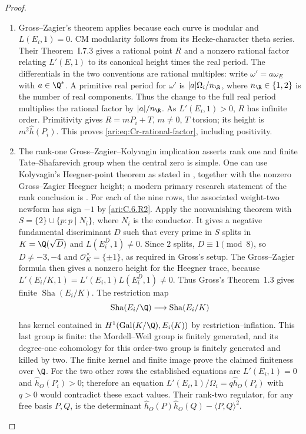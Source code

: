 \begin{proof}

\begin{enumerate}[label=\arabic*.,leftmargin=*]
\item Gross--Zagier's theorem applies because each curve is modular and
$L(E_i,1)=0$. CM modularity follows from its Hecke-character
theta series. Their Theorem~I.7.3 \citep[Chapter~I, Theorem~7.3, preprint p.~12]{CrGrossZagier1986} gives a rational point $R$ and
a nonzero rational factor relating $L'(E,1)$ to its canonical
height times the real period. The differentials in the two conventions are rational multiples:
write $\omega'=a\omega_E$ with $a\in\Q^*$.  A primitive real
period for $\omega'$ is $|a|\Omega_i/n_{\R}$, where
$n_{\R}\in\{1,2\}$ is the number of real components.
Thus the change to the full real period multiplies the rational
factor by $|a|/n_{\R}$.
As $L'(E_i,1)>0$, $R$ has infinite order. Primitivity gives
$R=mP_i+T$, $m\ne0$, $T$ torsion; its height is
$m^2\widehat h(P_i)$. This proves
\eqref{ari:eq:Cr-rational-factor}, including positivity.

\item The rank-one Gross--Zagier--Kolyvagin implication asserts rank one
and finite Tate--Shafarevich group when the central zero is simple.
One can use Kolyvagin's Heegner-point theorem as stated in
\citet[Theorem~1.3, pp.~235--236]{CrGross1991}, together with the nonzero
Gross--Zagier Heegner height; a modern primary research statement
of the rank conclusion is \citet[Theorem~1.1, p.~2 of arXiv v1]{CrJetchev2008}.
For each of the nine rows, the associated weight-two newform has
sign $-1$ by \cref{ari:C.6.R2}. Apply the nonvanishing theorem
\citep[Introduction, Theorem~(ii), pp.~543--544]{BumpFriedbergHoffstein1990}
with $S=\{2\}\cup\{p:p\mid N_i\}$, where $N_i$ is the conductor.
It gives a negative fundamental discriminant $D$ such that every
prime in $S$ splits in $K=\Q(\sqrt D)$ and $L(E_i^D,1)\ne0$.
Since $2$ splits, $D\equiv1\pmod8$, so $D\ne-3,-4$ and
$\mathcal O_K^\times=\{\pm1\}$, as required in Gross's setup.
The Gross--Zagier formula
\citep[Chapter~V, Theorem~2.1, preprint p.~127; proof of I.7.3, p.~129]{CrGrossZagier1986}
then gives a nonzero height for the Heegner trace, because
$L'(E_i/K,1)=L'(E_i,1)L(E_i^D,1)\ne0$.
Thus Gross's Theorem~1.3 gives finite $\operatorname{Sha}(E_i/K)$.
The restriction map
\[
\operatorname{Sha}(E_i/\Q)\longrightarrow
\operatorname{Sha}(E_i/K)
\]
has kernel contained in
$H^1(\operatorname{Gal}(K/\Q),E_i(K))$ by restriction--inflation.
This last group is finite: the Mordell--Weil group is finitely
generated, and its degree-one cohomology for this order-two group
is finitely generated and killed by two.  The finite kernel and
finite image prove the claimed finiteness over $\Q$.
For the two other rows the established equations are
$L'(E_i,1)=0$ and $\widehat h_O(P_i)>0$; therefore an equation
$L'(E_i,1)/\Omega_i=q\widehat h_O(P_i)$ with $q>0$ would contradict
these exact values.  Their rank-two regulator, for any free basis
$P,Q$, is the determinant
$\widehat h_O(P)\widehat h_O(Q)-\langle P,Q\rangle^2$.
\end{enumerate}

\end{proof}
